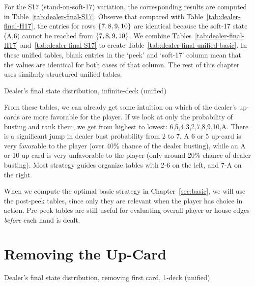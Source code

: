 For the S17 (stand-on-soft-17) variation, the corresponding results are
computed in Table~\ref{tab:dealer-final-S17}.
Observe that compared with Table~\ref{tab:dealer-final-H17},
the entries for rows $\left\{7,8,9,10\right\}$ are identical because the
soft-17 state (A,6) cannot be reached from $\left\{7,8,9,10\right\}$.
We combine Tables~\ref{tab:dealer-final-H17} and~\ref{tab:dealer-final-S17}
to create Table~\ref{tab:dealer-final-unified-basic}.
In these unified tables, blank entries in the `peek' and `soft-17' column
mean that the values are identical for both cases of that column.
The rest of this chapter uses similarly structured unified tables.  

\begin{table}[ht!]
\caption{Dealer's final state distribution, infinite-deck (unified)}
\begin{center}

\end{center}
\label{tab:dealer-final-unified-basic}
\end{table}

From these tables, we can already get some intuition on
which of the dealer's up-cards are more favorable for the player.
If we look at only the probability of busting and rank them, 
we get from highest to lowest: 6,5,4,3,2,7,8,9,10,A.
There is a significant jump in dealer bust probability from 2 to 7.  
A 6 or 5 up-card is very favorable to the player (over 40\% chance of 
the dealer busting), 
while an A or 10 up-card is very unfavorable to the player
(only around 20\% chance of dealer busting).
Most strategy guides organize tables with 2-6 on the left, 
and 7-A on the right.


When we compute the optimal basic strategy in Chapter~\ref{sec:basic}, 
we will use the post-peek tables, since only they are relevant
when the player has choice in action.  
Pre-peek tables are still useful for evaluating overall player or house
edges \emph{before} each hand is dealt.

\section{Removing the Up-Card}
\label{sec:dealer:reveal}

\begin{table}[ht!]
\caption{Dealer's final state distribution, removing first card, 1-deck (unified)}
\begin{center}

\end{center}
\label{tab:dealer-final-unified-dynamic-1}
\end{table}

